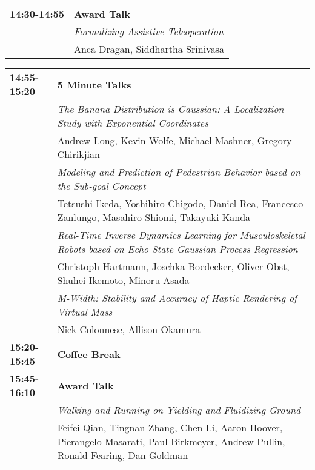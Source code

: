 \begin{tabular}{lp{13.8cm}}
{\bf 14:30-14:55} & {\bf Award Talk} \\[2mm]
& \em{ Formalizing Assistive Teleoperation}\\
& Anca Dragan\label{Dragan}, Siddhartha Srinivasa\\[2mm]
\end{tabular}

\newpage
\begin{tabular}{lp{13.8cm}}
{\bf 14:55-15:20} & {\bf 5 Minute Talks} \\[2mm]
& \em{ The Banana Distribution is Gaussian: A Localization Study with Exponential Coordinates}\\
& Andrew Long\label{Long}, Kevin Wolfe, Michael Mashner, Gregory Chirikjian\\[2mm]
& \em{ Modeling and Prediction of Pedestrian Behavior based on the Sub-goal Concept}\\
& Tetsushi Ikeda\label{Ikeda}, Yoshihiro Chigodo, Daniel Rea, Francesco Zanlungo, Masahiro Shiomi, Takayuki Kanda\\[2mm]
& \em{ Real-Time Inverse Dynamics Learning for Musculoskeletal Robots based on Echo State Gaussian Process Regression}\\
& Christoph Hartmann\label{Hartmann}, Joschka Boedecker, Oliver Obst, Shuhei Ikemoto, Minoru Asada\\[2mm]
& \em{ M-Width: Stability and Accuracy of Haptic Rendering of Virtual Mass}\\
& Nick Colonnese\label{Colonnese}, Allison Okamura\\[2mm]

{\bf 15:20-15:45} & {\bf Coffee Break} \\[4mm]

{\bf 15:45-16:10} & {\bf Award Talk} \\[2mm]
& \em{ Walking and Running on Yielding and Fluidizing Ground}\\
& Feifei Qian\label{Qian}, Tingnan Zhang, Chen Li, Aaron Hoover, Pierangelo Masarati, Paul Birkmeyer, Andrew Pullin, Ronald Fearing, Dan Goldman\\[2mm]


\end{tabular}

